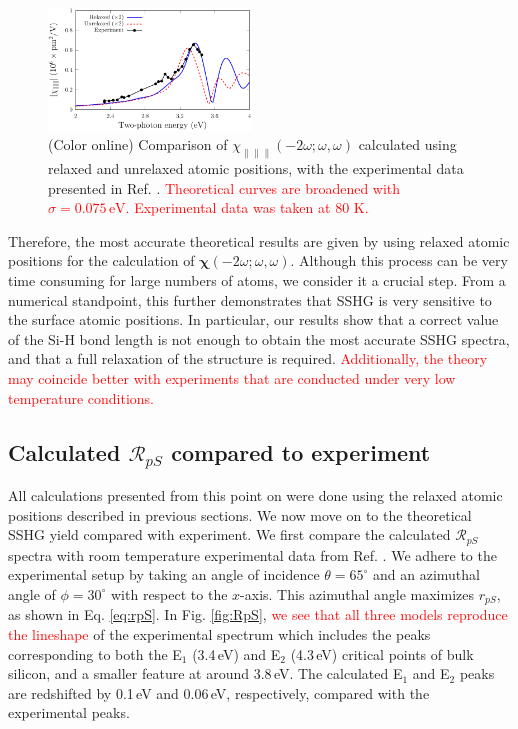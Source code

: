 \documentclass[prb,superscriptaddress,showpacs,twocolumn,letterpaper]{revtex4}
\newcommand{\correction}[1]{\textcolor{red}{#1}}
\newcommand{\change}[1]{\textcolor{red}{#1}}
\begin{document}
\begin{figure}[t]
\centering
\includegraphics[width=0.48\textwidth]{fig2}
\caption{(Color online) Comparison of
$\chi_{\parallel\parallel\parallel}(-2\omega;\omega,\omega)$ calculated using
relaxed and unrelaxed atomic positions, with the experimental data presented in
Ref. . 
\correction{Theoretical curves are broadened with $\sigma=0.075\,\text{eV}$.
} %
\correction{Experimental data was taken at 80 K.} %
\label{fig:Xxxx}}
\end{figure}

Therefore, the most accurate theoretical results are given by using relaxed
atomic positions for the calculation of
$\boldsymbol{\chi}(-2\omega;\omega,\omega)$. Although this process can be very
time consuming for large numbers of atoms, we consider it a crucial step. From a
numerical standpoint, this further demonstrates that SSHG is very sensitive to
the surface atomic positions. In particular, our results show that a correct
value of the Si-H bond length is not enough to obtain the most accurate SSHG
spectra, and that a full relaxation of the structure is required. 
\change{
Additionally, the theory may coincide better with experiments that are
conducted under very low temperature conditions.} %


\subsection{Calculated \texorpdfstring{$\mathcal{R}_{pS}$}{RpS} compared to
experiment}\label{sec: RpS}

All calculations presented from this point on were done using the relaxed atomic
positions described in previous sections. We now move on to the theoretical SSHG
yield compared with experiment. We first compare the calculated
$\mathcal{R}_{pS}$ spectra with room temperature experimental data from Ref.
. We adhere to the experimental setup by taking an angle
of incidence $\theta=65^{\circ}$ and an azimuthal angle of $\phi=30^\circ$ with
respect to the $x$-axis. This azimuthal angle maximizes $r_{pS}$, as shown in
Eq. \eqref{eq:rpS}. In Fig. \ref{fig:RpS}, 
\change{we see that all three models reproduce the lineshape} %
of the experimental spectrum which includes the peaks corresponding to both the
E$_{1}$ (3.4\,eV) and E$_{2}$ (4.3\,eV) critical points of bulk silicon, and a
smaller feature at around 3.8\,eV. The calculated E$_{1}$ and E$_{2}$ peaks are
redshifted by 0.1\,eV and 0.06\,eV, respectively, compared with the experimental
peaks.
\end{document}
